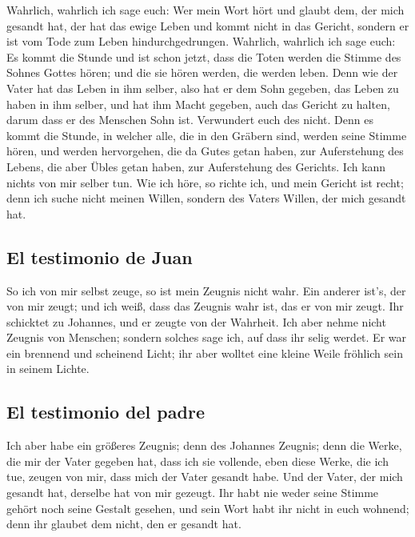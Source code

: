  Wahrlich, wahrlich ich sage euch: Wer mein Wort hört und
glaubt dem, der mich gesandt hat, der hat das ewige Leben und kommt
nicht in das Gericht, sondern er ist vom Tode zum Leben
hindurchgedrungen.  Wahrlich, wahrlich ich sage euch: Es
kommt die Stunde und ist schon jetzt, dass die Toten werden die Stimme
des Sohnes Gottes hören; und die sie hören werden, die werden leben.
 Denn wie der Vater hat das Leben in ihm selber, also hat
er dem Sohn gegeben, das Leben zu haben in ihm selber, 
und hat ihm Macht gegeben, auch das Gericht zu halten, darum dass er des
Menschen Sohn ist.  Verwundert euch des nicht. Denn es
kommt die Stunde, in welcher alle, die in den Gräbern sind, werden seine
Stimme hören,  und werden hervorgehen, die da Gutes getan
haben, zur Auferstehung des Lebens, die aber Übles getan haben, zur
Auferstehung des Gerichts.  Ich kann nichts von mir
selber tun. Wie ich höre, so richte ich, und mein Gericht ist recht;
denn ich suche nicht meinen Willen, sondern des Vaters Willen, der mich
gesandt hat.

\hypertarget{el-testimonio-de-juan}{%
\subsection{El testimonio de Juan}\label{el-testimonio-de-juan}}

 So ich von mir selbst zeuge, so ist mein Zeugnis nicht
wahr.  Ein anderer ist's, der von mir zeugt; und ich
weiß, dass das Zeugnis wahr ist, das er von mir zeugt. 
Ihr schicktet zu Johannes, und er zeugte von der Wahrheit.
 Ich aber nehme nicht Zeugnis von Menschen; sondern
solches sage ich, auf dass ihr selig werdet.  Er war ein
brennend und scheinend Licht; ihr aber wolltet eine kleine Weile
fröhlich sein in seinem Lichte.

\hypertarget{el-testimonio-del-padre}{%
\subsection{El testimonio del padre}\label{el-testimonio-del-padre}}

 Ich aber habe ein größeres Zeugnis; denn des Johannes
Zeugnis; denn die Werke, die mir der Vater gegeben hat, dass ich sie
vollende, eben diese Werke, die ich tue, zeugen von mir, dass mich der
Vater gesandt habe.  Und der Vater, der mich gesandt hat,
derselbe hat von mir gezeugt. Ihr habt nie weder seine Stimme gehört
noch seine Gestalt gesehen,  und sein Wort habt ihr nicht
in euch wohnend; denn ihr glaubet dem nicht, den er gesandt hat.

